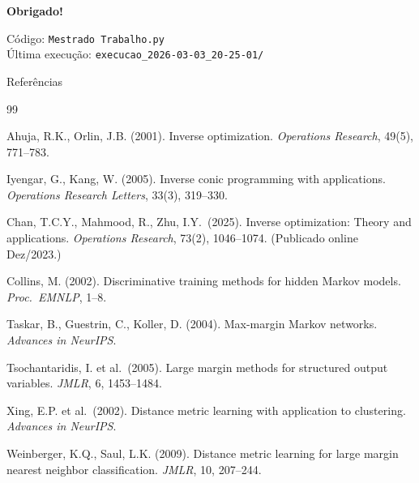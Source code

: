 \documentclass[aspectratio=169, 8pt]{beamer}
\begin{document}
\begin{frame}[plain]
  \begin{center}
    \vspace{1.5cm}
    {\Large \textbf{Obrigado!}}


    \small
    Código: \texttt{Mestrado Trabalho.py}\\
    Última execução: \texttt{execucao\_2026-03-03\_20-25-01/}
  \end{center}
\end{frame}


\begin{frame}[allowframebreaks]{Referências}
  \footnotesize
  \begin{thebibliography}{99}

    Ahuja, R.K., Orlin, J.B. (2001).
    Inverse optimization.
    \textit{Operations Research}, 49(5), 771--783.

    Iyengar, G., Kang, W. (2005).
    Inverse conic programming with applications.
    \textit{Operations Research Letters}, 33(3), 319--330.

    Chan, T.C.Y., Mahmood, R., Zhu, I.Y.\ (2025).
    Inverse optimization: Theory and applications.
    \textit{Operations Research}, 73(2), 1046--1074.
    (Publicado online Dez/2023.)

    Collins, M. (2002).
    Discriminative training methods for hidden Markov models.
    \textit{Proc.\ EMNLP}, 1--8.

    Taskar, B., Guestrin, C., Koller, D. (2004).
    Max-margin Markov networks.
    \textit{Advances in NeurIPS}.

    Tsochantaridis, I. et al.\ (2005).
    Large margin methods for structured output variables.
    \textit{JMLR}, 6, 1453--1484.

    Xing, E.P. et al.\ (2002).
    Distance metric learning with application to clustering.
    \textit{Advances in NeurIPS}.

    Weinberger, K.Q., Saul, L.K. (2009).
    Distance metric learning for large margin nearest neighbor classification.
    \textit{JMLR}, 10, 207--244.


\end{thebibliography}
\end{frame}
\end{document}
